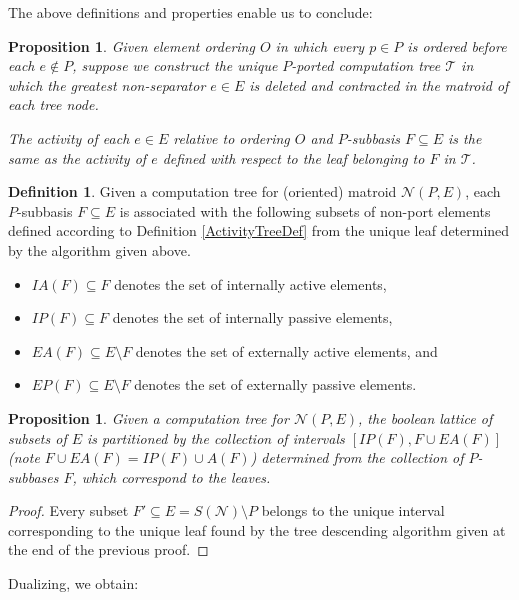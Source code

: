 \documentclass[12pt]{article}
\newtheorem{proposition}[theorem]{Proposition}
\theoremstyle{definition}
\newtheorem{definition}[theorem]{Definition}
\begin{document}
The above definitions and properties enable us to conclude:
\begin{proposition}
Given element ordering $O$ in which every $p\in P$ is ordered
before each $e\not\in P$, suppose we construct the unique $P$-ported
computation tree $\mathcal{T}$ in which the greatest non-separator $e\in E$ is
deleted and contracted in the matroid of each tree node.

The activity of each $e\in E$ relative to ordering $O$ and
$P$-subbasis $F\subseteq E$ is the same as the activity
of $e$ defined with respect to the leaf 
belonging to $F$ in $\mathcal{T}$.
\end{proposition}

\begin{definition}
\label{ActivitySymbolsDef}
Given a computation tree for 
(oriented) matroid $\mathcal{N}(P,E)$,
each $P$-subbasis $F\subseteq E$
is associated with the following subsets of non-port elements
defined according to Definition \ref{ActivityTreeDef}
from the unique leaf determined by the algorithm given above.
\begin{itemize}
\item $IA(F)\subseteq F$ denotes the set of internally active elements,
\item $IP(F)\subseteq F$ denotes the set of internally passive elements,
\item $EA(F)\subseteq E\setminus F$ 
denotes the set of externally active elements,
and 
\item $EP(F)\subseteq E\setminus F$ denotes the set of externally
passive elements.
\end{itemize}
\end{definition}

\begin{proposition}
\label{PartitionProposition}
Given a computation tree for
$\mathcal{N}(P,E)$, 
the boolean lattice of subsets of $E$
is partitioned by the collection of
intervals $[IP(F),F\cup EA(F)]$ (note $F\cup EA(F)=IP(F)\cup A(F)$)
determined from the collection
of $P$-subbases $F$, which correspond to the leaves.
\end{proposition}

\begin{proof}
Every subset $F'\subseteq E=S(\mathcal{N})\setminus P$ belongs to the
unique interval corresponding to the unique leaf found by the tree descending
algorithm given at the end of the previous proof.
\end{proof}

Dualizing, we obtain:
\end{document}
